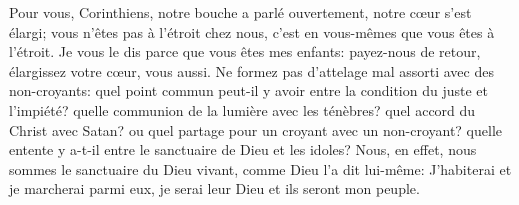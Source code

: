Pour vous, Corinthiens,
	notre bouche a parlé ouvertement, notre cœur s’est élargi;
	vous n’êtes pas à l’étroit chez nous,
	c’est en vous-mêmes que vous êtes à l’étroit.
Je vous le dis parce que vous êtes mes enfants:
	payez-nous de retour, élargissez votre cœur, vous aussi.
Ne formez pas d’attelage mal assorti avec des non-croyants:
	quel point commun peut-il y avoir entre la condition du juste et l’impiété?
	quelle communion de la lumière avec les ténèbres?
	quel accord du Christ avec Satan?
	ou quel partage pour un croyant avec un non-croyant?
	quelle entente y a-t-il entre le sanctuaire de Dieu et les idoles?
Nous, en effet, nous sommes le sanctuaire du Dieu vivant, comme Dieu l’a dit lui-même:
	J’habiterai et je marcherai parmi eux, je serai leur Dieu et ils seront mon peuple.
